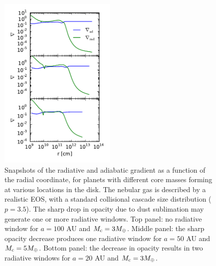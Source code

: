 \begin{figure}[h!]
\centering
\includegraphics[width=0.5\textwidth]{figures/del_vs_r.pdf}
\caption{Snapshots of the radiative and adiabatic gradient as a function of the radial coordinate, for planets with different core masses forming at various locations in the disk. The nebular gas is described by a realistic EOS, with a standard collisional cascade size distribution ($p=3.5$). The sharp drop in opacity due to dust sublimation may generate one or more radiative windows. Top panel: no radiative window for $a=100$ AU and $M_{\rm c}=3 M_{\oplus}$. Middle panel: the sharp opacity decrease produces one radiative window for $a=50$ AU and $M_{\rm c}=5 M_{\oplus}$. Bottom panel: the decrease in opacity results in two radiative windows for $a=20$ AU and $M_{\rm c}=3 M_{\oplus}$.}
\label{fig:delvsr}
\end{figure}



